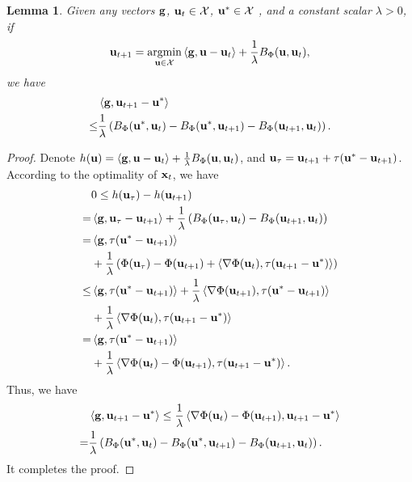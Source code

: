 \documentclass[journal]{IEEEtran}
\newtheorem{Lemma}{\bf{Lemma}}
\begin{document}
\begin{Lemma}
\label{lemma_mirror_descent_update_rule}
\nonumber
Given any vectors ${\bf g}$, ${\bf u}_t\in{\mathcal{X}}$, ${\bf u}^\ast\in{\mathcal{X}}$ , and a constant scalar $\lambda>0$, if 
\begin{align}
\nonumber
\u_{t+1} = \argmin_{\u\in\Xcal} \lrangle{\g, \u - \u_t} + \frac{1}{\lambda} B_{\Phi}(\u, \u_t),
\end{align} we have
\begin{align}
\nonumber
& \left\langle{\bf g}, {\bf u}_{t+1} - {\bf u}^\ast \right\rangle \\ \nonumber 
\le & \frac{1}{\lambda}\left(  B_{\Phi}({\bf u}^\ast, {\bf u}_t) -  B_{\Phi}({\bf u}^\ast, {\bf u}_{t+1}) - B_{\Phi}({\bf u}_{t+1}, {\bf u}_t)  \right).
\end{align}
\end{Lemma}
\begin{proof}

Denote $h({\bf u}) = \left\langle{\bf g}, {\bf u}-{\bf u}_t \right\rangle + \frac{1}{\lambda}B_{\Phi}({\bf u}, {\bf u}_t)$, and ${\bf u}_{\tau} = {\bf u}_{t+1} + \tau ({\bf u}^\ast - {\bf u}_{t+1})$. According to the optimality of ${\bf x}_t$, we have
\begin{align}
\nonumber
&0 \le  h({\bf u}_\tau) - h({\bf u}_{t+1}) \\ \nonumber
= & \left\langle{\bf g}, {\bf u}_\tau - {\bf u}_{t+1} \right\rangle + \frac{1}{\lambda}\left( B_{\Phi}({\bf u}_\tau, {\bf u}_t) - B_{\Phi}({\bf u}_{t+1}, {\bf u}_t) \right) \\ \nonumber
= & \left\langle{\bf g}, \tau ({\bf u}^\ast - {\bf u}_{t+1}) \right\rangle \\ \nonumber
& + \frac{1}{\lambda}\left(  \Phi({\bf u}_\tau) - \Phi({\bf u}_{t+1})  + \left\langle\nabla \Phi({\bf u}_t), \tau ({\bf u}_{t+1} - {\bf u}^\ast) \right\rangle  \right) \\ \nonumber
\le & \left\langle{\bf g}, \tau ({\bf u}^\ast - {\bf u}_{t+1}) \right\rangle + \frac{1}{\lambda} \left\langle\nabla \Phi({\bf u}_{t+1}), \tau ({\bf u}^\ast - {\bf u}_{t+1}) \right\rangle \\ \nonumber
& + \frac{1}{\lambda} \left\langle\nabla \Phi({\bf u}_t), \tau ({\bf u}_{t+1} - {\bf u}^\ast) \right\rangle  \\ \nonumber
= & \left\langle{\bf g}, \tau ({\bf u}^\ast - {\bf u}_{t+1}) \right\rangle  \\ \nonumber
& + \frac{1}{\lambda} \left\langle\nabla \Phi({\bf u}_t)-\Phi({\bf u}_{t+1}), \tau ({\bf u}_{t+1} - {\bf u}^\ast) \right\rangle.
\end{align} Thus, we have
\begin{align}
\nonumber
& \left\langle{\bf g}, {\bf u}_{t+1} - {\bf u}^\ast \right\rangle \le \frac{1}{\lambda} \left\langle\nabla \Phi({\bf u}_t)-\Phi({\bf u}_{t+1}), {\bf u}_{t+1} - {\bf u}^\ast \right\rangle  \\ \nonumber
= & \frac{1}{\lambda}\left(  B_{\Phi}({\bf u}^\ast, {\bf u}_t) -  B_{\Phi}({\bf u}^\ast, {\bf u}_{t+1}) - B_{\Phi}({\bf u}_{t+1}, {\bf u}_t)  \right).
\end{align} It completes the proof.
\end{proof}
\end{document}
